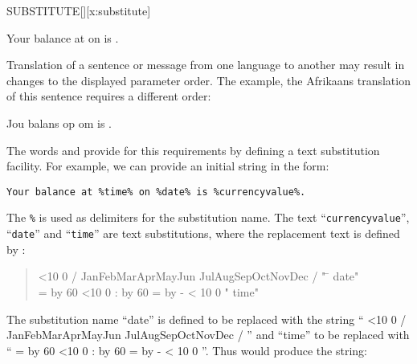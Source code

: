 \begin{worddef*}{}{SUBSTITUTE}[][x:substitute]
\begin{rationale}
		\begin{center}
			 Your balance at  on  is .
		\end{center}

		Translation of a sentence or message from one language to another may
		result in changes to the displayed parameter order.  The example, the
		Afrikaans translation of this sentence requires a different order:

		\begin{center}
			Jou balans op  om  is .
		\end{center}

		The words  and  provide for this
		requirements by defining a text substitution facility.  For example,
		we can provide an initial string in the form:

		\begin{center}
			\texttt{Your balance at \%time\% on \%date\% is \%currencyvalue\%.}
		\end{center}

		The \texttt{\%} is used as delimiters for the substitution name.  The
		text ``\texttt{currencyvalue}'', ``\texttt{date}'' and ``\texttt{time}''
		are text substitutions, where the replacement text is defined by
		:

\makeatletter
\newcommand{\ptime}{%
	\@tempcnta = \time
	\divide\@tempcnta by 60
	\ifnum\@tempcnta<10 0\fi%
	\number\@tempcnta%
	:%
	\multiply\@tempcnta by 60
	\@tempcntb = \time
	\advance\@tempcntb by -\@tempcnta
	\ifnum\@tempcntb < 10 0\fi%
	\number\@tempcntb
}

\newcommand{\pdate}{%
	\ifnum\day<10 0\fi%
	\number\day%
	/%
	\ifcase\month
	\or Jan\or Feb\or Mar\or Apr\or May\or Jun
	\or Jul\or Aug\or Sep\or Oct\or Nov\or Dec\fi%
	/%
	\number\year
}
\makeatother

		\begin{quote}\ttfamily
			\begin{tabbing}
				\word{Sq} \pdate" \=  date"  \\
				\word{Sq} \ptime" \>  time" 
			\end{tabbing}
		\end{quote}

		The substitution name ``date'' is defined to be replaced with the string
		``\pdate'' and ``time'' to be replaced with ``\ptime''.  Thus
		 would produce the string:


\end{rationale}
\end{worddef*}
